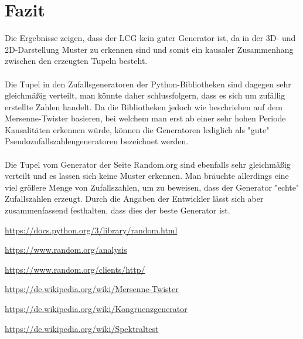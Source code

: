 \documentclass[12pt]{article}
\begin{document}
    \section{Fazit}\label{sec:fazit}
    Die Ergebnisse zeigen, dass der LCG kein guter Generator ist,
    da in der 3D- und 2D-Darstellung Muster zu erkennen sind und somit ein kausaler Zusammenhang zwischen den erzeugten Tupeln besteht.
    \\ \\
    Die Tupel in den Zufallsgeneratoren der Python-Bibliotheken sind dagegen sehr gleichmäßig verteilt,
    man könnte daher schlussfolgern, dass es sich um zufällig erstellte Zahlen handelt.
    Da die Bibliotheken jedoch wie beschrieben auf dem Mersenne-Twister basieren, bei welchem man erst ab einer sehr hohen Periode Kausalitäten erkennen würde,
    können die Generatoren lediglich als "gute" Pseudozufallszahlengeneratoren bezeichnet werden.
    \\ \\
    Die Tupel vom Generator der Seite Random.org sind ebenfalls sehr gleichmäßig verteilt und es lassen sich keine Muster erkennen.
    Man bräuchte allerdings eine viel größere Menge von Zufallszahlen, um zu beweisen, dass der Generator "echte" Zufallszahlen erzeugt.
    Durch die Angaben der Entwickler lässt sich aber zusammenfassend festhalten, dass dies der beste Generator ist.


    \vfill

    \begin{thebibliography}{12345}

        \url{https://docs.python.org/3/library/random.html}

        \url{https://www.random.org/analysis}

        \url{https://www.random.org/clients/http/}

        \url{https://de.wikipedia.org/wiki/Mersenne-Twister}

        \url{https://de.wikipedia.org/wiki/Kongruenzgenerator}

        \url{https://de.wikipedia.org/wiki/Spektraltest}

    \end{thebibliography}
\end{document}
